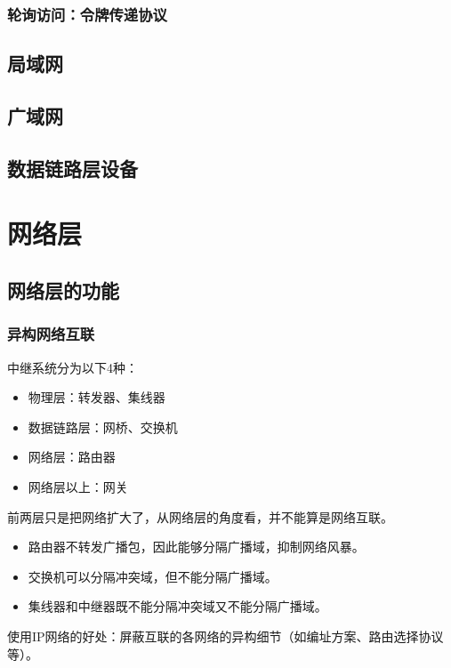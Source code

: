 \documentclass[12pt, a4paper, oneside]{ctexart}
\begin{document}
\subsubsection{轮询访问：令牌传递协议}

\subsection{局域网}

\subsection{广域网}

\subsection{数据链路层设备}

\section{网络层}

\subsection{网络层的功能}

\subsubsection{异构网络互联}

中继系统分为以下4种：
\begin{itemize}
    \item 物理层：转发器、集线器
    \item 数据链路层：网桥、交换机
    \item 网络层：路由器
    \item 网络层以上：网关
\end{itemize}

前两层只是把网络扩大了，从网络层的角度看，并不能算是网络互联。

\begin{itemize}
    \item 路由器不转发广播包，因此能够分隔广播域，抑制网络风暴。
    \item 交换机可以分隔冲突域，但不能分隔广播域。
    \item 集线器和中继器既不能分隔冲突域又不能分隔广播域。
\end{itemize}

使用IP网络的好处：屏蔽互联的各网络的异构细节（如编址方案、路由选择协议等）。
\end{document}
